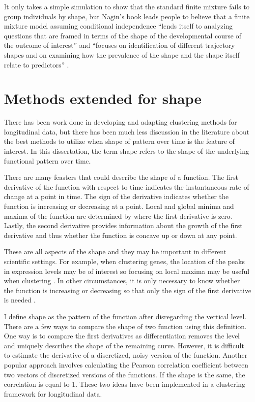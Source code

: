It only takes a simple simulation to show that the standard finite mixture fails to group individuals by shape, but Nagin's book leads people to believe that a finite mixture model assuming conditional independence ``lends itself to analyzing questions that are framed in terms of the shape of the developmental course of the outcome of interest''  and  ``focuses on identification of different trajectory shapes and on examining how the prevalence of the shape and the shape itself relate to predictors'' \cite{nagin2005}. 


\section{Methods extended for shape}
There has been work done in developing and adapting clustering methods for longitudinal data, but there has been much less discussion in the literature about the best methods to utilize when shape of pattern over time is the feature of interest. In this dissertation, the term shape refers to the shape of the underlying functional pattern over time.

There are many feasters that could describe the shape of a function. The first derivative of the function with respect to time indicates the instantaneous rate of change at a point in time. The sign of the derivative indicates whether the function is increasing or decreasing at a point.  Local and global minima and maxima of the function are determined by where the first derivative is zero. Lastly, the second derivative provides information about the growth of the first derivative and thus whether the function is concave up or down at any point. 

These are all aspects of the shape and they may be important in different scientific settings. For example, when clustering genes, the location of the peaks in expression levels may be of interest so focusing on local maxima may be useful when clustering \cite{luan2003}. In other circumstances, it is only necessary to know whether the function is increasing or decreasing so that only the sign of the first derivative is needed \cite{phang2003}. 

I define shape as the pattern of the function after disregarding the vertical level. There are a few ways to compare the shape of two function using this definition. One way is to compare the first derivatives as differentiation removes the level and uniquely describes the shape of the remaining curve. However, it is difficult to estimate the derivative of a discretized, noisy version of the function. Another popular approach involves calculating the Pearson correlation coefficient between two vectors of discretized versions of the functions. If the shape is the same, the correlation is equal to 1. These two ideas have been implemented in a clustering framework for longitudinal data.


